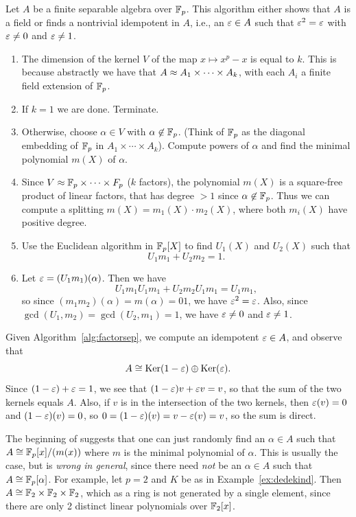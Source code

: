 \begin{algorithm}\label{alg:factorsep}
Let $A$ be a finite separable algebra over $\mathbb{F}_p$.  This
algorithm either shows that $A$ is a field or finds
a nontrivial idempotent in $A$, i.e., an $\varepsilon\in A$
such that $\varepsilon^2 = \varepsilon$ with $\varepsilon\neq 0$ and $\varepsilon\neq 1$.
\begin{enumerate}
\item The dimension of the kernel $V$ of the map $x\mapsto x^p - x$ is
  equal to $k$.  This is because abstractly we have that $A\approx
  A_1\times \cdots \times A_k$, with each $A_i$ a finite field
  extension of $\mathbb{F}_p$.
\item If $k=1$ we are done.  Terminate.
\item Otherwise, choose $\alpha \in V$ with $\alpha \not\in \mathbb{F}_p$.
(Think of $\mathbb{F}_p$ as the diagonal embedding of $\mathbb{F}_p$ in
$A_1\times \cdots \times A_k$).
Compute powers of $\alpha$ and find the minimal polynomial $m(X)$
of $\alpha$.
\item Since $V\approx \mathbb{F}_p \times \cdots \times F_p$ ($k$ factors),
the polynomial $m(X)$ is a square-free product of linear factors, that
has degree $>1$ since $\alpha\not\in\mathbb{F}_p$.  Thus we can compute
a splitting $m(X) = m_1(X) \cdot m_2(X)$, where both $m_i(X)$ have
positive degree.
\item Use the Euclidean algorithm in $\mathbb{F}_p[X]$ to find
$U_1(X)$ and $U_2(X)$ such that
$$
  U_1 m_1 + U_2 m_2 = 1.
$$
\item Let $\varepsilon = (U_1 m_1)(\alpha)$.  Then we have
$$
  U_1 m_1 U_1 m_1 + U_2 m_2 U_1 m_1 = U_1 m_1,
$$
so since $(m_1 m_2)(\alpha) = m(\alpha)=01$, we have $\varepsilon^2 = \varepsilon$.
Also, since $\gcd(U_1, m_2) = \gcd(U_2, m_1) = 1$,
we have $\varepsilon\neq 0$ and $\varepsilon \neq 1$.
\end{enumerate}
\end{algorithm}

Given Algorithm~\ref{alg:factorsep}, we compute an idempotent
$\varepsilon \in A$, and observe that
$$
 A \cong \operatorname{Ker}(1 - \varepsilon)  \oplus \operatorname{Ker}(\varepsilon).
$$
Since $(1 - \varepsilon) + \varepsilon = 1$, we see that
$(1 - \varepsilon)v + \varepsilon v = v$, so that the sum
of the two kernels equals $A$.
Also, if $v$ is in the intersection of the two kernels,
then $\varepsilon(v) = 0$ and $(1-\varepsilon)(v) =0$, so
$0 = (1-\varepsilon)(v) = v - \varepsilon(v) = v$, so the sum is direct.

\begin{remark}
  The beginning of \cite[\S6.2.4]{cohen:course_ant} suggests that one
  can just randomly find an $\alpha \in A$ such that $A\cong
  \mathbb{F}_p[x]/(m(x))$ where $m$ is the minimal polynomial of $\alpha$.
  This is usually the case, but is {\em wrong in general}, since there
  need {\em not} be an $\alpha \in A$ such that $A \cong
  \mathbb{F}_p[\alpha]$.  For example, let $p=2$ and $K$ be as in
  Example~\ref{ex:dedekind}.  Then $A\cong \mathbb{F}_2 \times \mathbb{F}_2 \times
  \mathbb{F}_2$, which as a ring is not generated by a single element, since
  there are only 2 distinct linear polynomials over $\mathbb{F}_2[x]$.
\end{remark}

